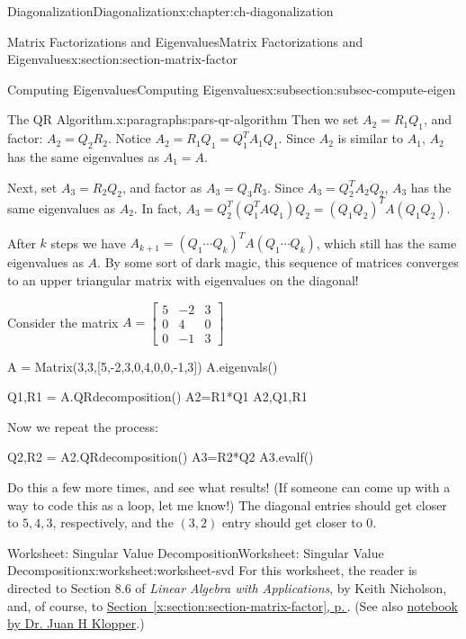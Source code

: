 \documentclass[oneside,10pt,]{book}
\newcommand{\xreffont}{\relax}
\numberwithin{equation}{section}
\begin{document}
\begin{chapterptx}{Diagonalization}{}{Diagonalization}{}{}{x:chapter:ch-diagonalization}
\begin{sectionptx}{Matrix Factorizations and Eigenvalues}{}{Matrix Factorizations and Eigenvalues}{}{}{x:section:section-matrix-factor}
\begin{subsectionptx}{Computing Eigenvalues}{}{Computing Eigenvalues}{}{}{x:subsection:subsec-compute-eigen}
\begin{paragraphs}{The QR Algorithm.}{x:paragraphs:pars-qr-algorithm}
Then we set \(A_2 = R_1Q_1\), and factor: \(A_2=Q_2R_2\). Notice \(A_2 = R_1Q_1 = Q_1^TA_1Q_1\). Since \(A_2\) is similar to \(A_1\), \(A_2\) has the same eigenvalues as \(A_1=A\).%
\par
Next, set \(A_3 = R_2Q_2\), and factor as \(A_3 = Q_3R_3\). Since \(A_3 = Q_2^TA_2Q_2\), \(A_3\) has the same eigenvalues as \(A_2\). In fact, \(A_3 = Q_2^T(Q_1^TAQ_1)Q_2 = (Q_1Q_2)^TA(Q_1Q_2)\).%
\par
After \(k\) steps we have \(A_{k+1} = (Q_1\cdots Q_k)^TA(Q_1\cdots Q_k)\), which still has the same eigenvalues as \(A\). By some sort of dark magic, this sequence of matrices converges to an upper triangular matrix with eigenvalues on the diagonal!%
\par
Consider the matrix \(A = \begin{bmatrix}5&-2&3\\0&4&0\\0&-1&3\end{bmatrix}\)%
\begin{sageinput}
A = Matrix(3,3,[5,-2,3,0,4,0,0,-1,3])
A.eigenvals()
\end{sageinput}
\begin{sageinput}
Q1,R1 = A.QRdecomposition()
A2=R1*Q1
A2,Q1,R1
\end{sageinput}
Now we repeat the process:%
\begin{sageinput}
Q2,R2 = A2.QRdecomposition()
A3=R2*Q2
A3.evalf()
\end{sageinput}
Do this a few more times, and see what results! (If someone can come up with a way to code this as a loop, let me know!) The diagonal entries should get closer to \(5,4,3\), respectively, and the \((3,2)\) entry should get closer to \(0\).%
\end{paragraphs}%
\end{subsectionptx}
\end{sectionptx}
%
%
\typeout{************************************************}
\typeout{************************************************}
%
\begin{worksheet-section}{Worksheet: Singular Value Decomposition}{}{Worksheet: Singular Value Decomposition}{}{}{x:worksheet:worksheet-svd}
For this worksheet, the reader is directed to Section 8.6 of \emph{Linear Algebra with Applications}, by Keith Nicholson, and, of course, to \hyperref[x:section:section-matrix-factor]{Section~{\xreffont\ref{x:section:section-matrix-factor}}, p.\,\pageref{x:section:section-matrix-factor}}. (See also \href{https://www.juanklopper.com/wp-content/uploads/2015/03/III_05_Singular_value_decomposition.html}{notebook by Dr. Juan H Klopper}.)%

\end{worksheet-section}
\end{chapterptx}
\end{document}
